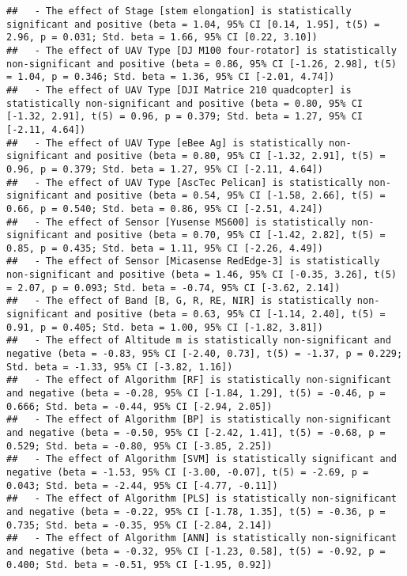 \documentclass[
]{article}
\begin{document}
\begin{verbatim}
##   - The effect of Stage [stem elongation] is statistically significant and positive (beta = 1.04, 95% CI [0.14, 1.95], t(5) = 2.96, p = 0.031; Std. beta = 1.66, 95% CI [0.22, 3.10])
##   - The effect of UAV Type [DJ M100 four-rotator] is statistically non-significant and positive (beta = 0.86, 95% CI [-1.26, 2.98], t(5) = 1.04, p = 0.346; Std. beta = 1.36, 95% CI [-2.01, 4.74])
##   - The effect of UAV Type [DJI Matrice 210 quadcopter] is statistically non-significant and positive (beta = 0.80, 95% CI [-1.32, 2.91], t(5) = 0.96, p = 0.379; Std. beta = 1.27, 95% CI [-2.11, 4.64])
##   - The effect of UAV Type [eBee Ag] is statistically non-significant and positive (beta = 0.80, 95% CI [-1.32, 2.91], t(5) = 0.96, p = 0.379; Std. beta = 1.27, 95% CI [-2.11, 4.64])
##   - The effect of UAV Type [AscTec Pelican] is statistically non-significant and positive (beta = 0.54, 95% CI [-1.58, 2.66], t(5) = 0.66, p = 0.540; Std. beta = 0.86, 95% CI [-2.51, 4.24])
##   - The effect of Sensor [Yusense MS600] is statistically non-significant and positive (beta = 0.70, 95% CI [-1.42, 2.82], t(5) = 0.85, p = 0.435; Std. beta = 1.11, 95% CI [-2.26, 4.49])
##   - The effect of Sensor [Micasense RedEdge-3] is statistically non-significant and positive (beta = 1.46, 95% CI [-0.35, 3.26], t(5) = 2.07, p = 0.093; Std. beta = -0.74, 95% CI [-3.62, 2.14])
##   - The effect of Band [B, G, R, RE, NIR] is statistically non-significant and positive (beta = 0.63, 95% CI [-1.14, 2.40], t(5) = 0.91, p = 0.405; Std. beta = 1.00, 95% CI [-1.82, 3.81])
##   - The effect of Altitude m is statistically non-significant and negative (beta = -0.83, 95% CI [-2.40, 0.73], t(5) = -1.37, p = 0.229; Std. beta = -1.33, 95% CI [-3.82, 1.16])
##   - The effect of Algorithm [RF] is statistically non-significant and negative (beta = -0.28, 95% CI [-1.84, 1.29], t(5) = -0.46, p = 0.666; Std. beta = -0.44, 95% CI [-2.94, 2.05])
##   - The effect of Algorithm [BP] is statistically non-significant and negative (beta = -0.50, 95% CI [-2.42, 1.41], t(5) = -0.68, p = 0.529; Std. beta = -0.80, 95% CI [-3.85, 2.25])
##   - The effect of Algorithm [SVM] is statistically significant and negative (beta = -1.53, 95% CI [-3.00, -0.07], t(5) = -2.69, p = 0.043; Std. beta = -2.44, 95% CI [-4.77, -0.11])
##   - The effect of Algorithm [PLS] is statistically non-significant and negative (beta = -0.22, 95% CI [-1.78, 1.35], t(5) = -0.36, p = 0.735; Std. beta = -0.35, 95% CI [-2.84, 2.14])
##   - The effect of Algorithm [ANN] is statistically non-significant and negative (beta = -0.32, 95% CI [-1.23, 0.58], t(5) = -0.92, p = 0.400; Std. beta = -0.51, 95% CI [-1.95, 0.92])

\end{verbatim}
\end{document}
